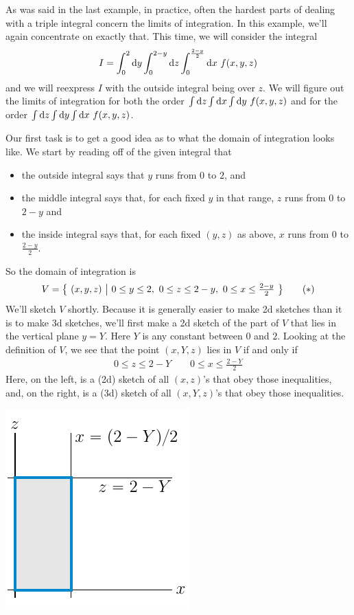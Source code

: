 \begin{eg}\label{eg 3d integrals exchange of order}
As was said in the last example, in practice, often the hardest parts of 
dealing with a triple integral concern the limits of integration.
In this example, we'll again concentrate on exactly that. This time, we will consider the integral
\begin{equation*}
I=\int_0^2\dee{y}\int_0^{2-y}\dee{z}\int_0^{\frac{2-y}{2}}\dee{x}\ f(x,y,z)
\end{equation*}
and we will reexpress $I$ with the outside integral being over $z$. We will 
figure out the limits of integration for both the order 
$\int\mathrm{d}z\int\mathrm{d}x\int\mathrm{d}y\ f(x,y,z)$ and for the order
$\int\dee{z}\int\dee{y}\int\dee{x}\ f(x,y,z)$.

Our first task is to get a good idea as to what the domain of integration looks like. We start by reading off of the given integral that
\begin{itemize} \itemsep1pt \parskip0pt 
\item
the outside integral says that $y$ runs from $0$ to $2$, and
\item
the middle integral says that, for each fixed $y$ in that range, $z$ runs from $0$ to $2-y$ and
\item
the inside integral says that, for each fixed $(y,z)$ as above,
$x$ runs from $0$ to $\frac{2-y}{2}$.
\end{itemize}
So the domain of integration is
\begin{equation*}
V=\Set{(x,y,z)}{ 0\le y\le 2,\ 
                 0\le z\le 2-y,\ 
                 0\le x\le \tfrac{2-y}{2}}
\tag{$*$}\end{equation*}
We'll sketch $V$ shortly. Because it is generally easier to make 2d sketches than it is to make 3d sketches, we'll first make a 2d sketch of the part of $V$ that lies in the vertical plane $y=Y$. Here $Y$ is any constant between 
$0$ and $2$. Looking at the definition of $V$, we see that the point $(x,Y,z)$ 
lies in $V$ if and only if
\begin{align*}
0\le z\le 2-Y\qquad   0\le x\le \frac{2-Y}{2}
\end{align*}
Here, on the left, is a (2d) sketch of all $(x,z)$'s that obey those
inequalities, and, on the right, is a (3d) sketch of all $(x,Y,z)$'s that obey those inequalities.
\begin{efig}
\begin{center}
    \includegraphics{figures/integration/xchange2.pdf}\qquad\qquad

\end{center}
\end{efig}
\end{eg}
